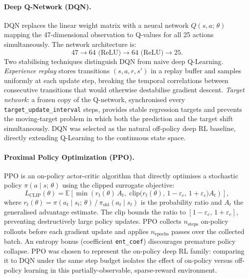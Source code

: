 \documentclass[11pt,a4paper]{article}
\begin{document}
\paragraph{Deep Q-Network (DQN).}
DQN replaces the linear weight matrix with a neural network
$Q(s, a;\, \theta)$ mapping the 47-dimensional observation to Q-values for
all 25 actions simultaneously. The network architecture is:
\[
  47 \rightarrow 64\text{ (ReLU)} \rightarrow 64\text{ (ReLU)} \rightarrow 25.
\]
Two stabilising techniques distinguish DQN from naive deep Q-Learning.
\textit{Experience replay} stores transitions $(s, a, r, s')$ in a replay
buffer and samples uniformly at each update step, breaking the temporal
correlations between consecutive transitions that would otherwise destabilise
gradient descent. \textit{Target network}: a frozen copy of the Q-network,
synchronised every \texttt{target\_update\_interval} steps, provides stable
regression targets and prevents the moving-target problem in which both the
prediction and the target shift simultaneously. DQN was selected as the
natural off-policy deep RL baseline, directly extending Q-Learning to the
continuous state space.

\paragraph{Proximal Policy Optimization (PPO).}
PPO is an on-policy actor-critic algorithm that directly optimises a
stochastic policy $\pi(a \mid s;\, \theta)$ using the clipped surrogate
objective:
\begin{equation}
  L_{\text{CLIP}}(\theta) = \mathbb{E}\!\left[\min\!\left(
      r_t(\theta)\,A_t,\;
      \text{clip}\!\bigl(r_t(\theta),\,1{-}\varepsilon_c,\,1{+}\varepsilon_c\bigr)
      A_t\right)\right],
  \label{eq:ppo}
\end{equation}
where $r_t(\theta) = \pi(a_t \mid s_t;\,\theta)\,/\,\pi_{\text{old}}(a_t \mid s_t)$
is the probability ratio and $A_t$ the generalised advantage estimate. The clip
bounds the ratio to $[1{-}\varepsilon_c,\, 1{+}\varepsilon_c]$, preventing
destructively large policy updates. PPO collects $n_{\text{steps}}$ on-policy
rollouts before each gradient update and applies $n_{\text{epochs}}$ passes
over the collected batch. An entropy bonus (coefficient \texttt{ent\_coef})
discourages premature policy collapse. PPO was chosen to represent the on-policy
deep RL family: comparing it to DQN under the same step budget isolates the
effect of on-policy versus off-policy learning in this partially-observable,
sparse-reward environment.
\end{document}
